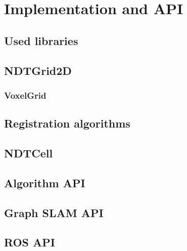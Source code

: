 \chapter{Implementation and API}
\section{Used libraries}
\section{NDTGrid2D}
\subsection{VoxelGrid}
\section{Registration algorithms}
\section{NDTCell}
\section{Algorithm API}
\section{Graph SLAM API}
\section{ROS API}
